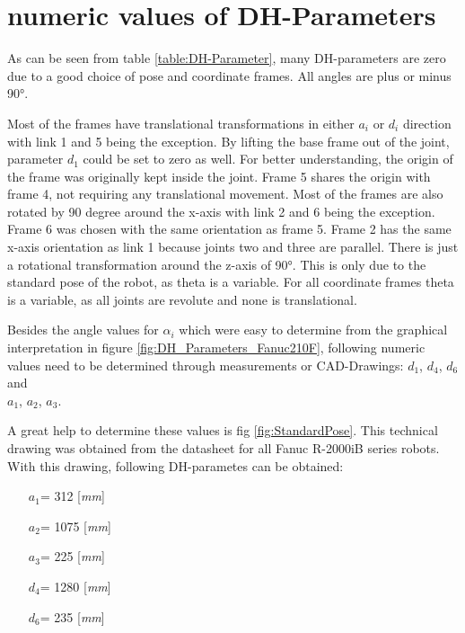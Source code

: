 \section{numeric values of DH-Parameters}

As can be seen from table \ref{table:DH-Parameter}, many \ac{DH}-parameters are zero due to a good choice of pose and coordinate frames. 
All angles are plus or minus 90°.
 
Most of the frames have translational transformations in either $a_i$ or $d_i$ direction with link 1 and 5 being the exception.
By lifting the base frame out of the joint, parameter $d_1$ could be set to zero as well. For better understanding, the origin of the frame was originally kept inside the joint.
Frame 5 shares the origin with frame 4, not requiring any translational movement.
Most of the frames are also rotated by 90 degree around the x-axis with link 2 and 6 being the exception. Frame 6 was chosen with the same orientation as frame 5. Frame 2 has the same x-axis orientation as link 1 because joints two and three are parallel. There is just a rotational transformation around the z-axis of 90°. This is only due to the standard pose of the robot, as theta is a variable.
For all coordinate frames theta is a variable, as all joints are revolute and none is translational. 

Besides the angle values for $\alpha_i$ which were easy to determine from the graphical interpretation in figure \ref{fig:DH_Parameters_Fanuc210F}, following numeric values need to be determined through measurements or CAD-Drawings:
$d_1$, $d_4$, $d_6$ and \\
$a_1$, $a_2$, $a_3$. 

A great help to determine these values is fig \ref{fig:StandardPose}. This technical drawing was obtained from the datasheet for all Fanuc R-2000iB series robots. 
With this drawing, following \ac{DH}-parametes can be obtained:

\begin{itemize}\label{item:DH-LinparamValues}
	\item[$a_1$=] 312 [\textit{mm}]
	\item[$a_2$=] 1075 [\textit{mm}]
	\item[$a_3$=] 225 [\textit{mm}]
	\item[$d_4$=] 1280 [\textit{mm}]
	\item[$d_6$=] 235 [\textit{mm}]
\end{itemize}

